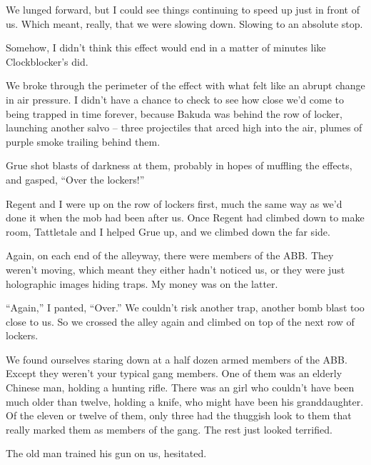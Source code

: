 We lunged forward, but I could see things continuing to speed up just in front of us.  Which meant, really, that we were slowing down.  Slowing to an absolute stop.



Somehow, I didn't think this effect would end in a matter of minutes like Clockblocker's did.



We broke through the perimeter of the effect with what felt like an abrupt change in air pressure.  I didn't have a chance to check to see how close we'd come to being trapped in time forever, because Bakuda was behind the row of locker, launching another salvo – three projectiles that arced high into the air, plumes of purple smoke trailing behind them.



Grue shot blasts of darkness at them, probably in hopes of muffling the effects, and gasped, ``Over the lockers!''



Regent and I were up on the row of lockers first, much the same way as we'd done it when the mob had been after us.  Once Regent had climbed down to make room, Tattletale and I helped Grue up, and we climbed down the far side.



Again, on each end of the alleyway, there were members of the ABB.  They weren't moving, which meant they either hadn't noticed us, or they were just holographic images hiding traps.  My money was on the latter.



``Again,'' I panted, ``Over.''  We couldn't risk another trap, another bomb blast too close to us.  So we crossed the alley again and climbed on top of the next row of lockers.



We found ourselves staring down at a half dozen armed members of the ABB.  Except they weren't your typical gang members.  One of them was an elderly Chinese man, holding a hunting rifle.  There was an girl who couldn't have been much older than twelve, holding a knife, who might have been his granddaughter.  Of the eleven or twelve of them, only three had the thuggish look to them that really marked them as members of the gang.  The rest just looked terrified.



The old man trained his gun on us, hesitated.



